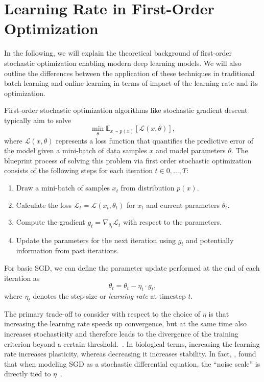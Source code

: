 \documentclass[letterpaper]{article} %
\begin{document}
\section{Learning Rate in First-Order Optimization}

In the following, we will explain the theoretical background of first-order stochastic optimization enabling modern deep learning models.
We will also outline the differences between the application of these techniques in traditional batch learning and online learning in terms of impact of the learning rate and its optimization.

First-order stochastic optimization algorithms like stochastic gradient descent typically aim to solve
\begin{equation}
	\min_{\theta} \mathbb{E}_{x \sim p(x)} [\mathcal{L}(x, \theta)],
\end{equation}
where $\mathcal{L}(x, \theta)$ represents a loss function that quantifies the predictive error of the model given a mini-batch of data samples $x$ and model parameters $\theta$.
The blueprint process of solving this problem via first order stochastic optimization consists of the following steps for each iteration $t \in 0, \ldots, T$:
\begin{enumerate}
	\item Draw a mini-batch of samples $x_t$ from distribution $p(x)$.
	\item Calculate the loss $\mathcal{L}_t = \mathcal{L}(x_t, \theta_t)$ for $x_t$ and current parameters $\theta_t$.
	\item Compute the gradient $g_t = \nabla_{\theta_t} \mathcal{L}_t$ with respect to the parameters.
	\item Update the parameters for the next iteration using $g_t$ and potentially information from past iterations.
\end{enumerate}

For basic SGD, we can define the parameter update performed at the end of each iteration as
\begin{equation}
	\theta_{t}  = \theta_{t} - \eta_t \cdot g_t,
\end{equation}
where $\eta_t$ denotes the step size or \textit{learning rate} at timestep $t$.

The primary trade-off to consider with respect to the choice of $\eta$ is that increasing the learning rate speeds up convergence, but at the same time also increases stochasticity and therefore leads to the divergence of the training criterion beyond a certain threshold.~\cite{bengioPracticalRecommendationsGradientbased2012}.
In biological terms, increasing the learning rate increases plasticity, whereas decreasing it increases stability.
In fact, \citet{smithBayesianPerspectiveGeneralization2018}, found that when modeling SGD as a stochastic differential equation, the “noise scale” is directly tied to $\eta$~\cite{smithBayesianPerspectiveGeneralization2018}.
\end{document}
